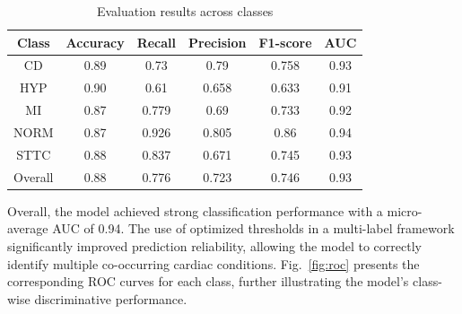 \documentclass[a4paper,fleqn]{cas-dc}
\begin{document}
\begin{table}[!htb]
\centering
\caption{Evaluation results across classes}
\small
\begin{tabular}{|c|c|c|c|c|c|}
\hline
{\bfseries Class} & {\bfseries Accuracy} & {\bfseries Recall} & {\bfseries Precision} & {\bfseries F1-score} & {\bfseries AUC} \\
\hline
CD    & 0.89 & 0.73  & 0.79  & 0.758 & 0.93  \\
\hline
HYP   & 0.90 & 0.61  & 0.658 & 0.633 & 0.91  \\
\hline
MI    & 0.87 & 0.779 & 0.69  & 0.733 & 0.92  \\
\hline
NORM  & 0.87 & 0.926 & 0.805 & 0.86  & 0.94  \\
\hline
STTC  & 0.88 & 0.837 & 0.671 & 0.745 & 0.93  \\
\hline
Overall & 0.88 & 0.776 & 0.723 & 0.746 & 0.93  \\
\hline
\end{tabular}
\label{tab:res}
\end{table}
Overall, the model achieved strong classification performance with a micro-average AUC of 0.94. The use of optimized thresholds in a multi-label framework significantly improved prediction reliability, allowing the model to correctly identify multiple co-occurring cardiac conditions. Fig.~\ref{fig:roc} presents the corresponding ROC curves for each class, further illustrating the model's class-wise discriminative performance.
\end{document}
